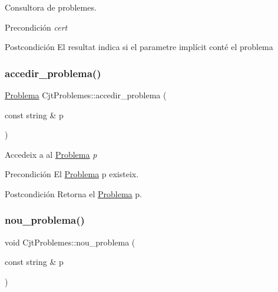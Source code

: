 Consultora de problemes. 

\begin{DoxyPrecond}{Precondición}
{\itshape cert} 
\end{DoxyPrecond}
\begin{DoxyPostcond}{Postcondición}
El resultat indica si el parametre implícit conté el problema 
\end{DoxyPostcond}
\mbox{\label{class_cjt_problemes_a2db39d9fee16e50c9a0ddfa1a5a2e460}} 
\subsubsection{\texorpdfstring{accedir\+\_\+problema()}{accedir\_problema()}}
{\footnotesize\ttfamily \mbox{\hyperlink{class_problema}{Problema}} Cjt\+Problemes\+::accedir\+\_\+problema (\begin{DoxyParamCaption}\item[{const string \&}]{p }\end{DoxyParamCaption})}



Accedeix a al \mbox{\hyperlink{class_problema}{Problema}} {\itshape p} 

\begin{DoxyPrecond}{Precondición}
El \mbox{\hyperlink{class_problema}{Problema}} p existeix. 
\end{DoxyPrecond}
\begin{DoxyPostcond}{Postcondición}
Retorna el \mbox{\hyperlink{class_problema}{Problema}} p. 
\end{DoxyPostcond}
\mbox{\label{class_cjt_problemes_a7a41c837128c629f7a4dcf81b1592581}} 
\subsubsection{\texorpdfstring{nou\+\_\+problema()}{nou\_problema()}}
{\footnotesize\ttfamily void Cjt\+Problemes\+::nou\+\_\+problema (\begin{DoxyParamCaption}\item[{const string \&}]{p }\end{DoxyParamCaption})}



